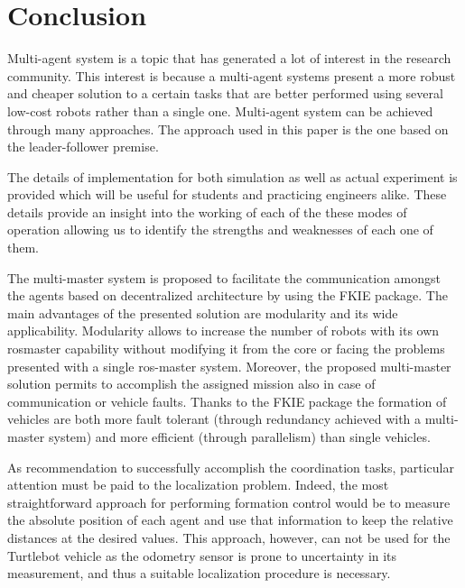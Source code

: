 \documentclass[journal]{IEEEtran}
\begin{document}
\section{Conclusion}


Multi-agent system is a topic that has generated a lot of interest in the research community. This interest is because a multi-agent systems present a more robust and cheaper solution to a certain tasks that are better performed using several low-cost robots rather than a single one. Multi-agent system can be achieved through many approaches. The approach used in this paper is the one based on the leader-follower premise.

The details of implementation for both simulation as well
as actual experiment is provided which will be useful for
students and practicing engineers alike. These details provide
an insight into the working of each of the these modes of
operation allowing us to identify the strengths and weaknesses
of each one of them.

The multi-master system is proposed to facilitate the communication amongst the agents based on decentralized architecture by using the FKIE package. The main advantages of the presented solution are modularity and its wide applicability. Modularity allows to increase the number of robots with its own rosmaster capability without modifying it from the core or facing the problems presented with a single ros-master system.  Moreover, the proposed multi-master solution permits to accomplish the assigned mission also in case of communication or vehicle faults. Thanks to the FKIE package the formation of vehicles are both more fault tolerant (through redundancy achieved with a multi-master system) and more efficient (through parallelism) than single vehicles.


As recommendation to successfully accomplish the coordination tasks, particular attention must be paid to the localization problem. Indeed, the most straightforward approach for performing formation control would be to measure the absolute position of each agent and use that information to keep the relative distances at the desired values. This approach, however, can not be used for the Turtlebot vehicle as the odometry sensor is prone to uncertainty in its measurement, and thus a suitable localization procedure is necessary.
\end{document}
